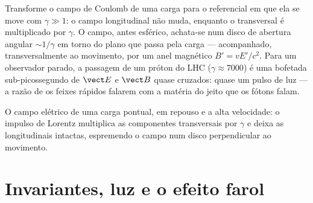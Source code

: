 \begin{example}\label{ex:b3:covariant-electromagnetism:pancake}
Transforme o campo de Coulomb de uma carga para o referencial em que
ela se move com $\gamma \gg 1$: o campo longitudinal não muda, enquanto
o transversal é multiplicado por $\gamma$. O campo, antes esférico,
achata-se num disco de abertura angular $\sim 1/\gamma$ em torno do
plano que passa pela carga --- acompanhado, transversalmente ao
movimento, por um anel magnético $B' = vE'/c^2$. Para um observador
parado, a passagem de um próton do LHC ($\gamma \approx 7000$) é uma
bofetada sub-picossegundo de $\vect E$ e $\vect B$ quase cruzados:
quase um pulso de luz --- a razão de os feixes rápidos falarem com a
matéria do jeito que os fótons falam.
\end{example}

\begin{omfigure}

{\small O campo elétrico de uma carga pontual, em repouso e a alta
velocidade: o impulso de Lorentz multiplica as componentes transversais
por $\gamma$ e deixa as longitudinais intactas, espremendo o campo num
disco perpendicular ao movimento.}
\end{omfigure}

\section{Invariantes, luz e o efeito farol}

